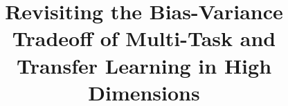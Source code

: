 \documentclass{article}
\begin{document}
\title{Revisiting the Bias-Variance Tradeoff of Multi-Task and Transfer Learning in High Dimensions}
\maketitle











\newpage
\appendix






\end{document}
